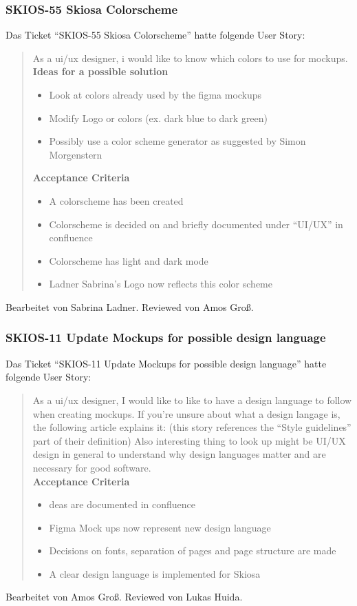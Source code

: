 \subsubsection{SKIOS-55 Skiosa Colorscheme}
Das Ticket \enquote{SKIOS-55 Skiosa Colorscheme} hatte folgende User Story:
\begin{quotation}
    As a ui/ux designer, i would like to know which colors to use for mockups. \\
    \textbf{Ideas for a possible solution}
    \begin{itemize}
    \item Look at colors already used by the figma mockups 
    \item Modify Logo or colors (ex. dark blue to dark green)
    \item Possibly use a color scheme generator as suggested by Simon Morgenstern
    \end{itemize}
    \textbf{Acceptance Criteria}
    \begin{itemize}
    \item A colorscheme has been created
    \item Colorscheme is decided on and briefly documented under “UI/UX” in confluence
    \item Colorscheme has light and dark mode
    \item Ladner Sabrina's Logo now reflects this color scheme
    \end{itemize}
\end{quotation}
Bearbeitet von Sabrina Ladner.
Reviewed von Amos Groß.

\subsubsection{SKIOS-11 Update Mockups for possible design language}
Das Ticket \enquote{SKIOS-11 Update Mockups for possible design language} hatte folgende User Story:
\begin{quotation}
    As a ui/ux designer, I would like to like to have a design language to follow when creating mockups.
    If you're unsure about what a design langage is, the following article explains it:  (this story references the \enquote{Style guidelines} part of their definition)
    Also interesting thing to look up might be UI/UX design in general to understand why design languages matter and are necessary for good software. \\
\textbf{Acceptance Criteria}
\begin{itemize}
    \item deas are documented in confluence
    \item Figma Mock ups now represent new design language
    \item Decisions on fonts, separation of pages and page structure are made
    \item A clear design language is implemented for Skiosa
\end{itemize}
\end{quotation}
Bearbeitet von Amos Groß.
Reviewed von Lukas Huida.

